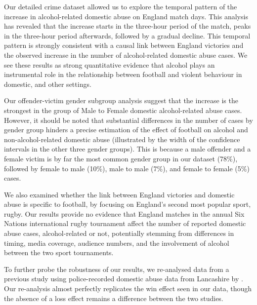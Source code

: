 \documentclass[12pt, a4paper]{article}
\begin{document}
Our detailed crime dataset allowed us to explore the temporal pattern of the increase in alcohol-related domestic abuse on England match days. This analysis has revealed that the increase starts in the three-hour period of the match, peaks in the three-hour period afterwards, followed by a gradual decline. This temporal pattern is strongly consistent with a causal link between England victories and the observed increase in the number of alcohol-related domestic abuse cases. We see these results as strong quantitative evidence that alcohol plays an instrumental role in the relationship between football and violent behaviour in domestic, and other settings. 










 Our offender-victim gender subgroup analysis suggest that the increase is the strongest in the group of Male to Female domestic alcohol-related abuse cases. However, it should be noted that substantial differences in the number of cases by gender group hinders a precise estimation of the effect of football on alcohol and non-alcohol-related domestic abuse (illustrated by the width of the confidence intervals in the other three gender groups). This is because a male offender and a female victim is by far the most common gender group in our dataset (78\%), followed by female to male (10\%), male to male (7\%), and female to female (5\%) cases.


We also examined whether the link between England victories and domestic abuse is specific to football, by focusing on England's second most popular sport, rugby. Our results provide no evidence that England matches in the annual Six Nations international rugby tournament affect the number of reported domestic abuse cases, alcohol-related or not, potentially stemming from differences in timing, media coverage, audience numbers, and the involvement of alcohol between the two sport tournaments.

To further probe the robustness of our results, we re-analysed data from a previous study using police-recorded domestic abuse data from Lancashire by . Our re-analysis almost perfectly replicates the win effect seen in our data, though the absence of a loss effect remains a difference between the two studies.
\end{document}
